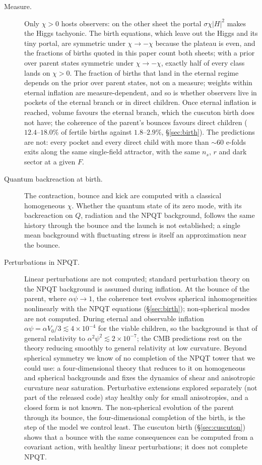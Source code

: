 \documentclass[11pt,a4paper]{article}
\begin{document}
\begin{description}
\item[Measure.] Only $\chi>0$ hosts observers: on the other sheet the portal $\sigma\chi|H|^2$ makes the Higgs tachyonic. The birth equations, which leave out the Higgs and its tiny portal, are symmetric under $\chi\to-\chi$ because the plateau is even, and the fractions of births quoted in this paper count both sheets; with a prior over parent states symmetric under $\chi\to-\chi$, exactly half of every class lands on $\chi>0$. The fraction of births that land in the eternal regime depends on the prior over parent states, not on a measure; weights within eternal inflation are measure-dependent, and so is whether observers live in pockets of the eternal branch or in direct children. Once eternal inflation is reached, volume favours the eternal branch, which the cuscuton birth does not have; the coherence of the parent's bounces favours direct children ($12.4$--$18.0\%$ of fertile births against $1.8$--$2.9\%$, \S\ref{sec:birth}). The predictions are not: every pocket and every direct child with more than $\sim60$ e-folds exits along the same single-field attractor, with the same $n_s$, $r$ and dark sector at a given $F$.
\item[Quantum backreaction at birth.] The contraction, bounce and kick are computed with a classical homogeneous $\chi$. Whether the quantum state of its zero mode, with its backreaction on $Q$, radiation and the NPQT background, follows the same history through the bounce and the launch is not established; a single mean background with fluctuating stress is itself an approximation near the bounce.
\item[Perturbations in NPQT.] Linear perturbations are not computed; standard perturbation theory on the NPQT background is assumed during inflation. At the bounce of the parent, where $\alpha\psi\to1$, the coherence test evolves spherical inhomogeneities nonlinearly with the NPQT equations (\S\ref{sec:birth}); non-spherical modes are not computed. During eternal and observable inflation $\alpha\psi=\alpha V_0/3\lesssim4\times10^{-4}$ for the viable children, so the background is that of general relativity to $\alpha^2\psi^2\lesssim2\times10^{-7}$; the CMB predictions rest on the theory reducing smoothly to general relativity at low curvature. Beyond spherical symmetry we know of no completion of the NPQT tower that we could use: a four-dimensional theory that reduces to it on homogeneous and spherical backgrounds and fixes the dynamics of shear and anisotropic curvature near saturation. Perturbative extensions explored separately (not part of the released code) stay healthy only for small anisotropies, and a closed form is not known. The non-spherical evolution of the parent through its bounce, the four-dimensional completion of the birth, is the step of the model we control least. The cuscuton birth (\S\ref{sec:cuscuton}) shows that a bounce with the same consequences can be computed from a covariant action, with healthy linear perturbations; it does not complete NPQT.

\end{description}
\end{document}
